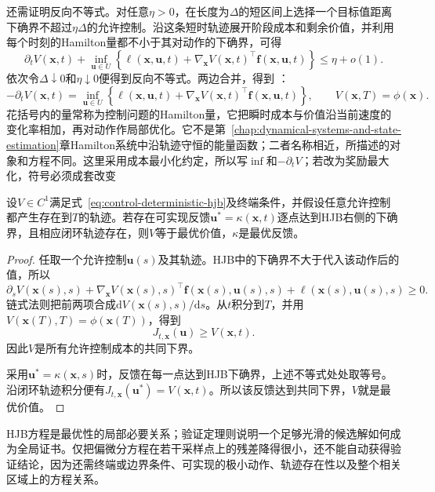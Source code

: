 还需证明反向不等式。对任意$\eta>0$，在长度为$\Delta$的短区间上选择一个目标值距离下确界不超过$\eta\Delta$的允许控制。沿这条短时轨迹展开阶段成本和剩余价值，并利用每个时刻的Hamilton量都不小于其对动作的下确界，可得
\[
  \partial_tV(\bm{x},t)
  +
  \inf_{\bm{u}\in U}
  \left\{
    \ell(\bm{x},\bm{u},t)
    +
    \nabla_{\bm{x}}V(\bm{x},t)^{\top}
    \bm{f}(\bm{x},\bm{u},t)
  \right\}
  \leq
  \eta+o(1).
\]
依次令$\Delta\downarrow0$和$\eta\downarrow0$便得到反向不等式。两边合并，得到
：
\begin{equation}
  -\partial_tV(\bm{x},t)
  =
  \inf_{\bm{u}\in U}
  \left\{
    \ell(\bm{x},\bm{u},t)
    +
    \nabla_{\bm{x}}V(\bm{x},t)^{\top}
    \bm{f}(\bm{x},\bm{u},t)
  \right\},
  \qquad
  V(\bm{x},T)=\phi(\bm{x}).
  \label{eq:control-deterministic-hjb}
\end{equation}
花括号内的量常称为控制问题的Hamilton量，它把瞬时成本与价值沿当前速度的变化率相加，再对动作作局部优化。它不是第~\ref{chap:dynamical-systems-and-state-estimation}章Hamilton系统中沿轨迹守恒的能量函数；二者名称相近，所描述的对象和方程不同。这里采用成本最小化约定，所以写$\inf$和$-\partial_tV$；若改为奖励最大化，符号必须成套改变
\begin{theorem}[确定性HJB验证定理]
\label{thm:control-hjb-verification}
设$V\in C^1$满足式~\eqref{eq:control-deterministic-hjb}及终端条件，并假设任意允许控制都产生存在到$T$的轨迹。若存在可实现反馈$\bm{u}^{\ast}=\kappa(\bm{x},t)$逐点达到HJB右侧的下确界，且相应闭环轨迹存在，则$V$等于最优价值，$\kappa$是最优反馈。
\end{theorem}
\begin{proof}
任取一个允许控制$\bm{u}(s)$及其轨迹。HJB中的下确界不大于代入该动作后的值，所以
\[
  \partial_sV(\bm{x}(s),s)
  +
  \nabla_{\bm{x}}V(\bm{x}(s),s)^{\top}
  \bm{f}(\bm{x}(s),\bm{u}(s),s)
  +
  \ell(\bm{x}(s),\bm{u}(s),s)
  \geq0.
\]
链式法则把前两项合成$\mathrm{d}V(\bm{x}(s),s)/\mathrm{d}s$。从$t$积分到$T$，并用$V(\bm{x}(T),T)=\phi(\bm{x}(T))$，得到
\[
  J_{t,\bm{x}}(\bm{u})
  \geq V(\bm{x},t).
\]
因此$V$是所有允许控制成本的共同下界。

采用$\bm{u}^{\ast}=\kappa(\bm{x},s)$时，反馈在每一点达到HJB下确界，上述不等式处处取等号。沿闭环轨迹积分便有$J_{t,\bm{x}}(\bm{u}^{\ast})=V(\bm{x},t)$。所以该反馈达到共同下界，$V$就是最优价值。
\end{proof}
HJB方程是最优性的局部必要关系；验证定理则说明一个足够光滑的候选解如何成为全局证书。仅把偏微分方程在若干采样点上的残差降得很小，还不能自动获得验证结论，因为还需终端或边界条件、可实现的极小动作、轨迹存在性以及整个相关区域上的方程关系。
